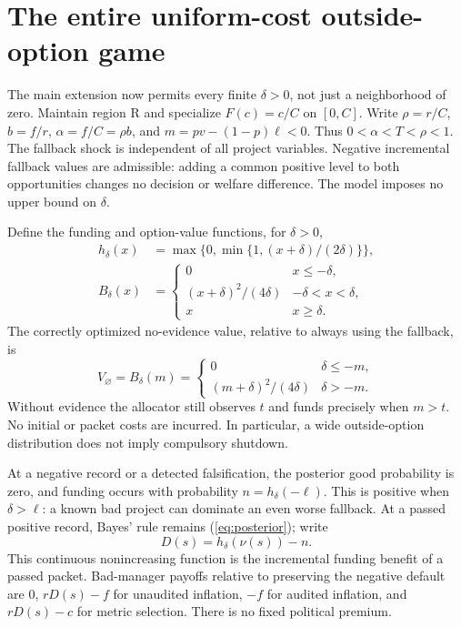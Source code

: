 \documentclass[11pt]{article}
\begin{document}
\section{The entire uniform-cost outside-option game}\label{sec:global}
The main extension now permits every finite $\delta>0$, not just a neighborhood of zero. Maintain region R and specialize $F(c)=c/C$ on $[0,C]$. Write $\rho=r/C$, $b=f/r$, $\alpha=f/C=\rho b$, and $m=pv-(1-p)\ell<0$. Thus $0<\alpha<T<\rho<1$. The fallback shock is independent of all project variables. Negative incremental fallback values are admissible: adding a common positive level to both opportunities changes no decision or welfare difference. The model imposes no upper bound on $\delta$.

Define the funding and option-value functions, for $\delta>0$,
\begin{align}
h_\delta(x)&=\max\{0,\min\{1,(x+\delta)/(2\delta)\}\},\label{eq:clip}\\
B_\delta(x)&=\begin{cases}0&x\leq-\delta,\\(x+\delta)^2/(4\delta)&-\delta<x<\delta,\\x&x\geq\delta.\end{cases}\label{eq:option}
\end{align}
The correctly optimized no-evidence value, relative to always using the fallback, is
\begin{equation}V_\varnothing=B_\delta(m)=\begin{cases}0&\delta\leq-m,\\(m+\delta)^2/(4\delta)&\delta>-m.\end{cases}\label{eq:none}
\end{equation}
Without evidence the allocator still observes $t$ and funds precisely when $m>t$. No initial or packet costs are incurred. In particular, a wide outside-option distribution does not imply compulsory shutdown.

At a negative record or a detected falsification, the posterior good probability is zero, and funding occurs with probability $n=h_\delta(-\ell)$. This is positive when $\delta>\ell$: a known bad project can dominate an even worse fallback. At a passed positive record, Bayes' rule remains (\ref{eq:posterior}); write
\begin{equation}D(s)=h_\delta(\nu(s))-n.\label{eq:increment}
\end{equation}
This continuous nonincreasing function is the incremental funding benefit of a passed packet. Bad-manager payoffs relative to preserving the negative default are $0$, $rD(s)-f$ for unaudited inflation, $-f$ for audited inflation, and $rD(s)-c$ for metric selection. There is no fixed political premium.
\end{document}
